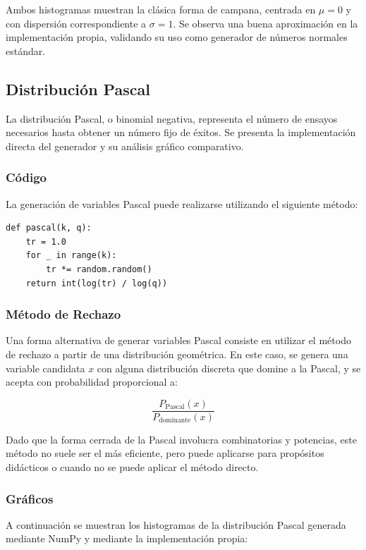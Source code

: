 \documentclass{article}
\begin{document}
Ambos histogramas muestran la clásica forma de campana, centrada en \( \mu = 0 \) y con dispersión correspondiente a \( \sigma = 1 \). Se observa una buena aproximación en la implementación propia, validando su uso como generador de números normales estándar.


\subsection{Distribución Pascal}
La distribución Pascal, o binomial negativa, representa el número de ensayos necesarios hasta obtener un número fijo de éxitos. Se presenta la implementación directa del generador y su análisis gráfico comparativo.

\subsubsection{Código}
La generación de variables Pascal puede realizarse utilizando el siguiente método:

\begin{verbatim}
def pascal(k, q):
    tr = 1.0
    for _ in range(k):
        tr *= random.random()
    return int(log(tr) / log(q))
\end{verbatim}

\subsubsection{Método de Rechazo}
Una forma alternativa de generar variables Pascal consiste en utilizar el método de rechazo a partir de una distribución geométrica. En este caso, se genera una variable candidata \( x \) con alguna distribución discreta que domine a la Pascal, y se acepta con probabilidad proporcional a:

\[
\frac{P_{\text{Pascal}}(x)}{P_{\text{dominante}}(x)}
\]

Dado que la forma cerrada de la Pascal involucra combinatorias y potencias, este método no suele ser el más eficiente, pero puede aplicarse para propósitos didácticos o cuando no se puede aplicar el método directo.

\subsubsection{Gráficos}
A continuación se muestran los histogramas de la distribución Pascal generada mediante NumPy y mediante la implementación propia:
\end{document}
